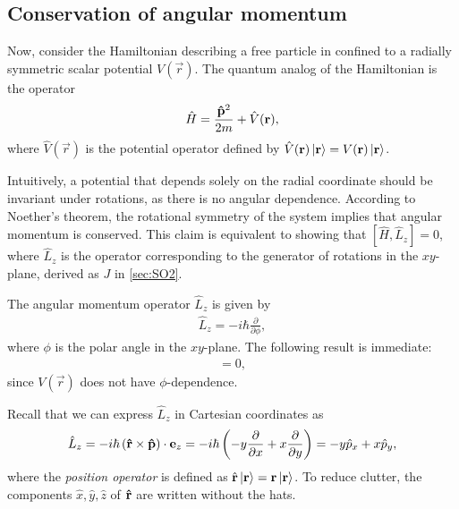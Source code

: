 \subsection{Conservation of angular momentum}\label{sub:cons_ang_mom}
Now, consider the Hamiltonian describing a free particle in confined to a radially symmetric scalar potential $V(\vec{r})$.
The quantum analog of the Hamiltonian is the operator
\begin{align*}
    \hat{H} = \frac{\mathbf{\hat{p}}^2}{2m}  + \hat{V}(\mathbf{r}),
\end{align*}
where $\hat{V}(\vec{r})$ is the potential operator defined by $\hat{V}(\mathbf{r})\ket{\mathbf{r}} = V(\mathbf{r})\ket{\mathbf{r}}$.

Intuitively, a potential that depends solely on the radial coordinate should be invariant under rotations, as there is no angular dependence. According to Noether's theorem, the rotational symmetry of the system implies that angular momentum is conserved. This claim is equivalent to showing that $[\hat{H},\hat{L}_z] = 0$, where $\hat{L}_z$ is the operator corresponding to the generator of rotations in the $xy$-plane, derived as $J$ in \cref{sec:SO2}.

The angular momentum operator $\hat{L}_z$ is given by
\begin{align*}
    \hat{L}_z = -i\hbar \frac{\partial}{\partial\phi},
\end{align*}
where $\phi$ is the polar angle in the $xy$-plane. The following result is immediate:
\begin{align*}
    [V(\vec{r}),\hat{L}_z] = 0,
\end{align*}
since $V(\vec{r})$ does not have $\phi$-dependence.

Recall that we can express $\hat{L}_z$ in Cartesian coordinates as
\begin{align}\label{eq:Lz_cartesian}
    \hat{L}_z = -i\hbar \left( \mathbf{\hat{r}}\times\mathbf{\hat{p}} \right)\cdot\mathbf{e}_z = -i\hbar\left( -y\frac{\partial}{\partial x} + x\frac{\partial}{\partial y} \right) =  -y \hat{p}_x + x \hat{p}_y,
\end{align}
where the \textit{position operator} is defined as $\hat{\mathbf{r}}\ket{\mathbf{r}} = \mathbf{r}\ket{\mathbf{r}}$. To reduce clutter, the components $\hat{x}, \hat{y}, \hat{z}$ of $\mathbf{\hat{r}}$ are written without the hats.

